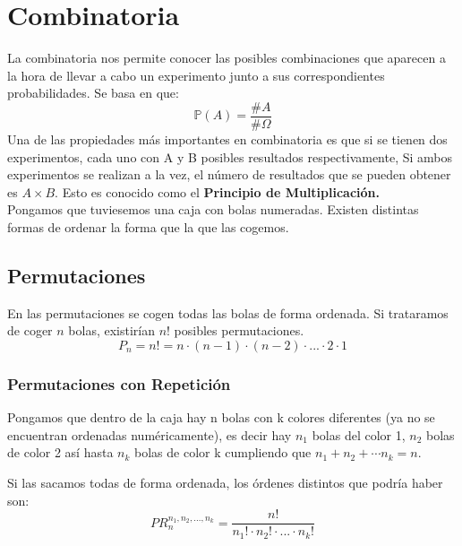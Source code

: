 \documentclass[11pt]{article}
\newcommand{\prob}{\mathbb{P}}
\newcommand{\OMG}{\varOmega}
\theoremstyle{plain}
\begin{document}
        \section{Combinatoria} %
        \label{sec:combinatoria}
            La combinatoria nos permite conocer las posibles combinaciones que aparecen a la hora de llevar a cabo un experimento junto a sus correspondientes probabilidades. Se basa en que:
            \begin{equation}
                \prob (A) = \frac{\#A}{\#\OMG}
            \end{equation}
            Una de las propiedades más importantes en combinatoria es que si se tienen dos experimentos, cada uno con A y B posibles resultados respectivamente, Si ambos experimentos se realizan a la vez, el número de resultados que se pueden obtener es $A \times B$. Esto es conocido como el \textbf{Principio de Multiplicación.}\\

            Pongamos que tuviesemos una caja con bolas numeradas. Existen distintas formas de ordenar la forma que la que las cogemos.
            \subsection{Permutaciones} %
            \label{sub:permutaciones}
                En las permutaciones se cogen todas las bolas de forma ordenada. Si trataramos de coger $n$ bolas, existirían $n!$ posibles permutaciones.
                \begin{equation}\label{eq:15}
                    P_n = n! = n \cdot (n-1) \cdot (n-2) \cdot ... \cdot 2 \cdot 1 
                \end{equation}
                \subsubsection{Permutaciones con Repetición} %
                \label{subsub:permutaciones_con_repetición}
                    Pongamos que dentro de la caja hay n bolas con k colores diferentes (ya no se encuentran ordenadas numéricamente), es decir hay $n_1$ bolas del color 1, $n_2$ bolas de color 2 así hasta $n_k$ bolas de color k cumpliendo que $n_1 + n_2 + \cdots n_k = n$.

                    Si las sacamos todas de forma ordenada, los órdenes distintos que podría haber son:
                    \begin{equation}
                         PR_n^{n_1,n_2,...,n_k} = \frac{n!}{n_1! \cdot n_2! \cdot ... \cdot n_k!}
                     \end{equation}
\end{document}
